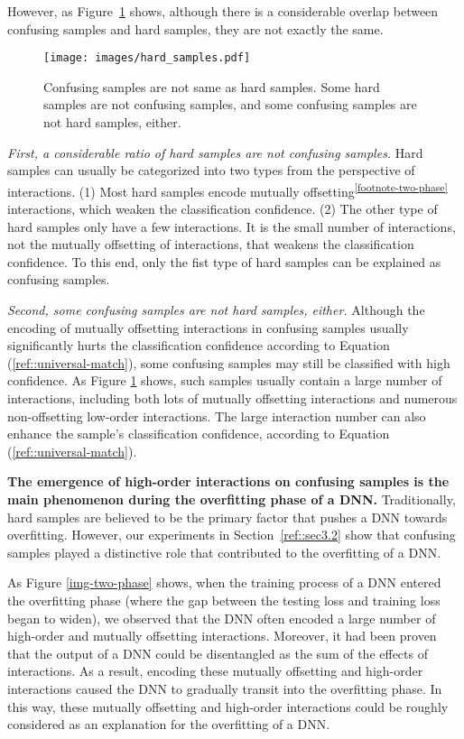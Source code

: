 \documentclass[10pt,twocolumn,letterpaper]{article}
\begin{document}
However, as Figure~\ref{img::specific-samples} shows, although there is a considerable overlap between confusing samples and hard samples, they are not exactly the same.

\begin{figure}[t]
    \centering
    \texttt{[image: images/hard\_samples.pdf]}
    \vspace{-10pt}
    \caption{Confusing samples are not same as hard samples. Some hard samples are not confusing samples, and some confusing samples are not hard samples, either.}
    \vspace{-10pt}
    \label{img::specific-samples}
\end{figure}


\textit{First, a considerable ratio of hard samples are not confusing samples.} Hard samples can usually be categorized into two types from the perspective of interactions. (1) Most hard samples encode mutually offsetting\textsuperscript{\ref{footnote-two-phase}} interactions, which weaken the classification confidence. (2) The other type of hard samples only have a few interactions. It is the small number of interactions, not the mutually offsetting of interactions, that weakens the classification confidence. To this end, only the fist type of hard samples can be explained as confusing samples.

\textit{Second, some confusing samples are not hard samples, either.} Although the encoding of mutually offsetting interactions in confusing samples usually significantly hurts the classification confidence according to Equation (\ref{ref::universal-match}), some confusing samples may still be classified with high confidence. As Figure \ref{img::specific-samples} shows, such samples usually contain a large number of interactions, including both lots of mutually offsetting interactions and numerous non-offsetting low-order interactions.
The large interaction number can also enhance the sample's classification confidence, according to Equation (\ref{ref::universal-match}).


\textbf{The emergence of high-order interactions on confusing samples is the main phenomenon during the overfitting phase of a DNN.} Traditionally, hard samples are believed to be the primary factor that pushes a DNN towards overfitting. However, our experiments in Section~\ref{ref::sec3.2} show that confusing samples played a distinctive role that contributed to the overfitting of a DNN.


As Figure \ref{img-two-phase} shows, when the training process of a DNN entered the overfitting phase (where the gap between the testing loss and training loss began to widen), we observed that the DNN often encoded a large number of high-order and mutually offsetting interactions. Moreover, it had been proven that the output of a DNN could be disentangled as the sum of the effects of interactions. As a result, encoding these mutually offsetting and high-order interactions caused the DNN to gradually transit into the overfitting phase. In this way, these mutually offsetting and high-order interactions could be roughly considered as an explanation for the overfitting of a DNN.
\end{document}
